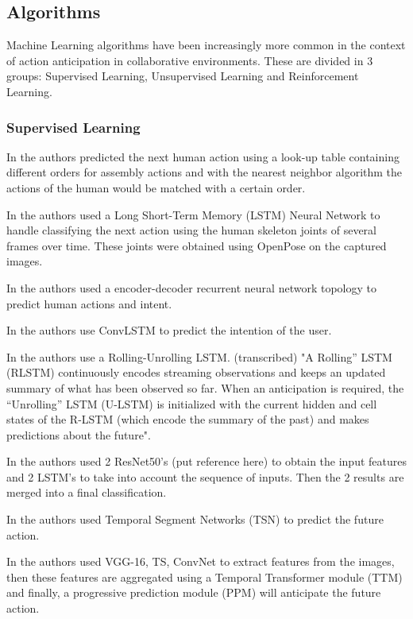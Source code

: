 \subsection{Algorithms}

Machine Learning algorithms have been increasingly more common in the context of action anticipation in collaborative environments. These are divided in 3 groups: Supervised Learning, Unsupervised Learning and Reinforcement Learning.

\subsubsection{Supervised Learning}

In \cite{Maeda2016} the authors predicted the next human action using a look-up table containing different orders for assembly actions and with the nearest neighbor algorithm the actions of the human would be matched with a certain order.

In \cite{Canuto2021} the authors used a Long Short-Term Memory (LSTM) Neural Network to handle classifying the next action using the human skeleton joints of several frames over time. These joints were obtained using OpenPose on the captured images.

In \cite{Schydlo2018} the authors used a encoder-decoder recurrent neural network topology to predict human actions and intent.

In \cite{Zhang2022} the authors use ConvLSTM to predict the intention of the user.

In \cite{Furnari2021} the authors use a Rolling-Unrolling LSTM. {\color{red} (transcribed) "A Rolling” LSTM (RLSTM) continuously encodes streaming observations and keeps an updated summary of what has been observed so far. When an anticipation is required, the “Unrolling” LSTM (U-LSTM) is initialized with the current hidden and cell states of the R-LSTM (which encode the summary of the past) and makes predictions about the future".}

In \cite{Gammulle2019} the authors used 2 ResNet50's {\color{red} (put reference here)} to obtain the input features and 2 LSTM's to take into account the sequence of inputs. Then the 2 results are merged into a final classification.

In \cite{Wu2021} the authors used Temporal Segment Networks (TSN) to predict the future action.

In \cite{Wang2021} the authors used VGG-16, TS, ConvNet to extract features from the images, then these features are aggregated using a Temporal Transformer module (TTM) and finally, a progressive prediction module (PPM) will anticipate the future action.


